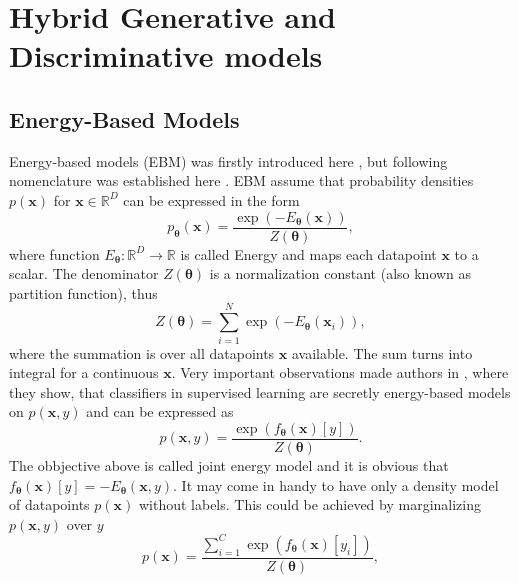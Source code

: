 \chapter{Hybrid Generative and Discriminative models}

\section{Energy-Based Models}\label{EBM}
Energy-based models (EBM) was firstly introduced here \cite{energy}, but following nomenclature was established here \cite{energy2}. EBM assume that probability densities $p(\boldsymbol{x})$ for $\boldsymbol{x} \in \mathbb{R}^D$ can be expressed in the form
\begin{equation}
	p_{\boldsymbol{\theta}}\left(\boldsymbol{x}\right) = \frac{\exp\left(-E_{\boldsymbol{\theta}}(\boldsymbol{x})\right)}{Z(\boldsymbol{\theta})},
\end{equation}
where function $E_{\boldsymbol{\theta}} : \mathbb{R}^D \to \mathbb{R}$ is called Energy and maps each datapoint $\boldsymbol{x}$ to a scalar. The denominator $Z(\boldsymbol{\theta})$ is a normalization constant (also known as partition function), thus
\begin{equation}
	Z(\boldsymbol{\theta}) = \sum_{i=1}^N \exp\left(-E_{\boldsymbol{\theta}}(\boldsymbol{x}_i)\right),
\end{equation}
where  the summation is over all datapoints $\boldsymbol{x}$ available. The sum turns into integral for a continuous $\boldsymbol{x}$.   Very important observations made authors in \cite{energy2}, where they show, that classifiers in supervised learning are secretly energy-based models on $p(\boldsymbol{x},y)$ and can be expressed as
\begin{equation}
	p\left(\boldsymbol{x},y\right) = \frac{\exp\left({f_{\boldsymbol{\theta}}\left(\boldsymbol{x}\right)[y]}\right)}{Z(\boldsymbol{\theta})}.
\end{equation}
The obbjective above is called joint energy model and it is obvious that $f_{\boldsymbol{\theta}}\left(\boldsymbol{x}\right)[y] = -E_{\boldsymbol{\theta}}(\boldsymbol{x},y)$. It may come in handy to have only a density model of datapoints $p(\boldsymbol{x})$ without labels. This could be achieved by marginalizing $p(\boldsymbol{x},y)$ over $y$ 
\begin{equation}
	p\left(\boldsymbol{x}\right) = \frac{\sum_{i=1}^C\exp\left({f_{\boldsymbol{\theta}}\left(\boldsymbol{x}\right)[y_i]}\right)}{Z(\boldsymbol{\theta})},
\end{equation}
